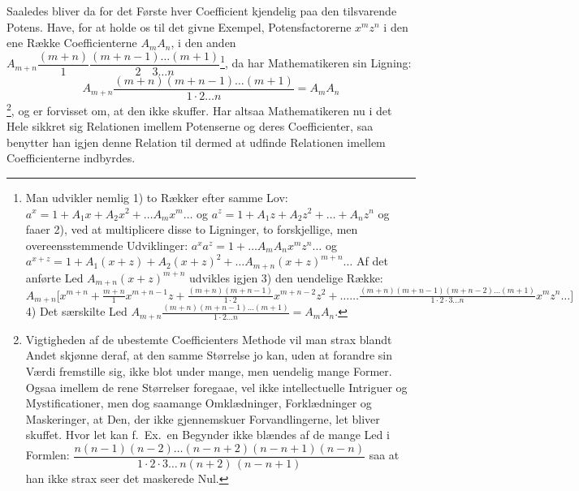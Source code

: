 \documentclass[12pt]{book}
\newcommand{\opage}[1]{\marginnote{\footnotesize\textit{[#1]}}}
\begin{document}
\opage{29} Saaledes bliver da for det Første hver Coefficient kjendelig paa den tilsvarende
Potens. Have, for at holde os til det givne Exempel, Potensfactorerne
$x^{m}z^{n}$ i den ene Række Coefficienterne $A_m A_n$, i den anden
$A_{m+n}\dfrac{(m+n)}{1}\dfrac{(m+n-1)\dots(m+1)}{2\quad 3\dots n}$\footnote{Man
udvikler nemlig 1) to Rækker efter samme Lov: $a^{x} = 1 + A_1 x + A_2 x^{2} +
\dots A_m x^{m}\dots$ og $a^{z} = 1 + A_1 z + A_2 z^{2} + \dots + A_n z^{n}$ og
faaer 2), ved at multiplicere disse to Ligninger, to forskjellige, men
overeensstemmende Udviklinger: $a^{x}a^{z} = 1 + \dots A_m A_n x^{m}z^{n}\dots$
og $a^{x+z} = 1 + A_1(x+z) + A_2(x+z)^{2} + \dots A_{m+n}(x+z)^{m+n}\dots$ Af det
anførte Led $A_{m+n}(x+z)^{m+n}$ udvikles igjen 3) den uendelige Række:
$A_{m+n}\big[x^{m+n} + \frac{m+n}{1}x^{m+n-1}z +
\frac{(m+n)(m+n-1)}{1\cdot 2}x^{m+n-2}z^{2} + \dots\dots
\frac{(m+n)(m+n-1)(m+n-2)\dots(m+1)}{1\cdot 2\cdot 3\dots n}x^{m}z^{n}\dots\big]$
4) Det særskilte Led $A_{m+n}\frac{(m+n)(m+n-1)\dots(m+1)}{1\cdot 2\dots n} =
A_m A_n$.}, da har Mathematikeren sin Ligning:
\[
A_{m+n}\frac{(m+n)(m+n-1)\dots(m+1)}{1\cdot 2\dots n} = A_m A_n
\]\footnote{Vigtigheden af de ubestemte Coefficienters Methode vil man strax
blandt Andet skjønne deraf, at den samme Størrelse jo kan, uden at forandre sin
Værdi fremstille sig, ikke blot under mange, men uendelig mange Former. Ogsaa
imellem de rene Størrelser foregaae, vel ikke intellectuelle Intriguer og
Mystificationer, men dog saamange Omklædninger, Forklædninger og Maskeringer, at
Den, der ikke gjennemskuer Forvandlingerne, let bliver skuffet. Hvor let kan
f.\ Ex.\ en Begynder ikke blændes af de mange Led i Formlen:
$\dfrac{n(n-1)(n-2)\dots(n-n+2)(n-n+1)(n-n)}{1\cdot 2\cdot 3\dots\,
n(n+2)\,(n-n+1)}$ saa at han ikke strax seer det maskerede Nul.}, og er forvisset
om, at den ikke skuffer. Har altsaa Mathematikeren nu i det Hele sikkret sig
Relationen imellem Potenserne og deres Coefficienter, saa benytter han
\opage{30} igjen denne Relation til dermed at udfinde Relationen imellem Coefficienterne
indbyrdes.
\end{document}
